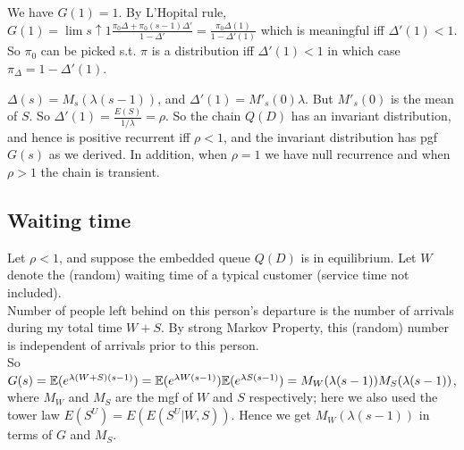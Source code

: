 \documentclass[a4paper]{article}
\begin{document}
We have $G(1) = 1$. By L'Hopital rule, $G(1) = \lim{s \uparrow 1} \frac{\pi_0 \Delta + \pi_0(s-1)\Delta'}{1-\Delta'} = \frac{\pi_0 \Delta(1)}{1-\Delta'(1)}$ which is meaningful iff $\Delta'(1) < 1$. So $\pi_0$ can be picked s.t. $\pi$ is a distribution iff $\Delta'(1) < 1$ in which case $\pi_\Delta = 1-\Delta'(1)$.

$\Delta(s) = M_s(\lambda(s-1))$, and $\Delta'(1) = M'_s(0) \lambda$. But $M'_s(0)$ is the mean of $S$. So $\Delta'(1) = \frac{E(S)}{1/\lambda} = \rho$. So the chain $Q(D)$ has an invariant distribution, and hence is positive recurrent iff $\rho<1$, and the invariant distribution has pgf $G(s)$ as we derived. In addition, when $\rho=1$ we have null recurrence and when $\rho>1$ the chain is transient.

\subsection{Waiting time}
Let $\rho < 1$, and suppose the embedded queue $Q(D)$ is in equilibrium. Let $W$ denote the (random) waiting time of a typical customer (service time not included).\\
Number of people left behind on this person's departure is the number of arrivals during my total time $W+S$. By strong Markov Property, this (random) number is independent of arrivals prior to this person.\\
So $G(s) = \mathbb{E}(e^{\lambda (W+S) (s-1)}) = \mathbb{E}(e^{\lambda W(s-1)}) \mathbb{E}(e^{\lambda S(s-1)}) = M_W(\lambda(s-1))M_S(\lambda(s-1))$, where $M_W$ and $M_S$ are the mgf of $W$ and $S$ respectively; here we also used the tower law $E(S^U) = E(E(S^U|W,S))$. Hence we get $M_W(\lambda(s-1))$ in terms of $G$ and $M_S$.

\end{document}
